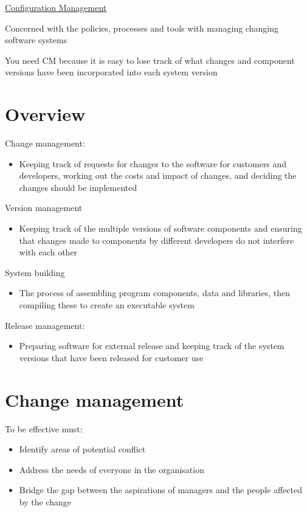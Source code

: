 \documentclass{article}[18pt]
\begin{document}
\begin{center}
\underline{\huge Configuration Management}
\end{center}
\begin{definition}
Concerned with the policies, processes and tools with managing changing software systems
\end{definition}
You need CM because it is easy to lose track of what changes and component versions have been incorporated into each system version
\section{Overview}
Change management:
\begin{itemize}
	\item Keeping track of requests for changes to the software for customers and developers, working out the costs and impact of changes, and deciding the changes should be implemented
\end{itemize}
Version management
\begin{itemize}
	\item Keeping track of the multiple versions of software components and ensuring that changes made to components by different developers do not interfere with each other
\end{itemize}
System building
\begin{itemize}
	\item The process of assembling program components, data and libraries, then compiling these to create an executable system
\end{itemize}
Release management:
\begin{itemize}
	\item Preparing software for external release and keeping track of the system versions that have been released for customer use
\end{itemize}
\section{Change management}
To be effective must:
\begin{itemize}
	\item Identify areas of potential conflict
	\item Address the needs of everyone in the organisation
	\item Bridge the gap between the aspirations of managers and the people affected by the change
\end{itemize}
\end{document}
